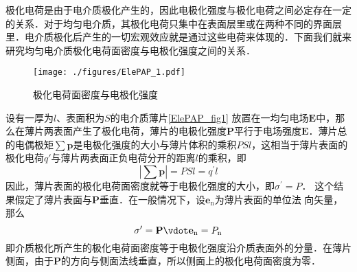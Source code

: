 
\begin{issues}
\end{issues}


极化电荷是由于电介质极化产生的，因此电极化强度与极化电荷之间必定存在一定的关系．对于均匀电介质，其极化电荷只集中在表面层里或在两种不同的界面层里．电介质极化后产生的一切宏观效应就是通过这些电荷来体现的．下面我们就来研究均匀电介质极化电荷面密度与电极化强度之间的关系．

\begin{figure}[ht]
\centering
\texttt{[image: ./figures/ElePAP\_1.pdf]}
\caption{极化电荷面密度与电极化强度} \label{ElePAP_fig1}
\end{figure}
设有一厚为$l$、表面积为$S $的电介质薄片\autoref{ElePAP_fig1} 放置在一均匀电场$\mathbf E $中，那么在薄片两表面产生了极化电荷，薄片的电极化强度$\mathbf P $平行于电场强度$\mathbf E$．薄片总的电偶极矩$\sum \mathbf p$是电极化强度的大小与薄片体积的乘积$PSl$，这相当于薄片表面的极化电荷$q' $与薄片两表面正负电荷分开的距离$l $的乘积，即
\begin{equation}
\left|\sum \mathbf p\right|=P S l=q^{\prime} l
\end{equation}
因此，薄片表面的极化电荷面密度就等于电极化强度的大小，即$\sigma^{\prime}=P$．
这个结果假定了薄片表面与$\mathbf P $垂直．在一般情况下，设$\mathbf e_\mathrm{n} $为薄片表面的单位法
向矢量，那么
\begin{equation}
\sigma^{\prime}=\mathbf P \vdot \mathbf e_{\mathrm{n}}=P_{\mathrm{n}}
\end{equation}
即介质极化所产生的极化电荷面密度等于电极化强度沿介质表面外的分量．在薄片侧面，由于$\mathbf P $的方向与侧面法线垂直，所以侧面上的极化电荷面密度为零．

